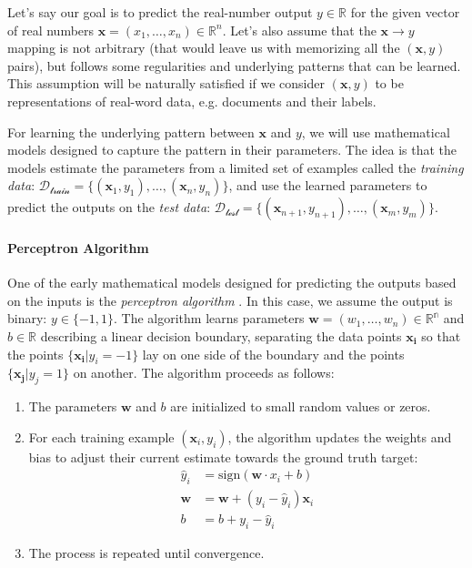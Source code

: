 Let's say our goal is to predict the real-number output $y \in \mathbb{R}$ for the given vector of real numbers $\mathbf{x} = (x_1, \ldots, x_n) \in \mathbb{R}^n$.
Let's also assume that the $\mathbf{x} \rightarrow y$ mapping is not arbitrary (that would leave us with memorizing all the $(\mathbf{x},y)$ pairs), but follows some regularities and underlying patterns that can be learned. This assumption will be naturally satisfied if we consider $(\mathbf{x},y)$ to be representations of real-word data, e.g. documents and their labels.

For learning the underlying pattern between $\mathbf{x}$ and $y$, we will use mathematical models designed to capture the pattern in their parameters. The idea is that the models estimate the parameters from a limited set of examples called the \textit{training data}:  $\mathcal{D_{\text{train}}} = \{(\mathbf{x}_1, y_1), \ldots, (\mathbf{x}_{n}, y_{n})\}$, and use the learned parameters to predict the outputs on the \textit{test data}: $\mathcal{D_{\text{test}}} = \{(\mathbf{x}_{n+1}, y_{n+1}), \ldots, (\mathbf{x}_{m}, y_{m})\}$.

\paragraph{Perceptron Algorithm} One of the early mathematical models designed for predicting the outputs based on the inputs is the \emph{perceptron algorithm} \cite{rosenblatt1958perceptron}. In this case, we assume the output is binary: $y \in \{-1, 1\}$. The algorithm learns parameters $\textbf{w} = (w_1, \ldots, w_n) \in \mathbb{R^n}$ and $b \in \mathbb{R}$ describing a linear decision boundary, separating the data points $\mathbf{x_i}$ so that the points $\{\mathbf{x_i} | y_i = -1\}$ lay on one side of the boundary and the points $\{\mathbf{x_j} | y_j = 1\}$ on another. The algorithm proceeds as follows:


\begin{enumerate}
    \item The parameters $\textbf{w}$ and $b$ are initialized to small random values or zeros.
    \item For each training example $(\mathbf{x}_i, y_i)$, the algorithm updates the weights and bias to adjust their current estimate towards the ground truth target:
          \begin{align} \label{eq:perceptron1}
              \hat{y}_i  & = \text{sign}(\textbf{w} \cdot x_i + b)       \\
              \textbf{w} & = \textbf{w} + (y_i - \hat{y}_i) \textbf{x}_i \\
              b          & = b + y_i - \hat{y}_i
          \end{align}
    \item The process is repeated until convergence.
\end{enumerate}

